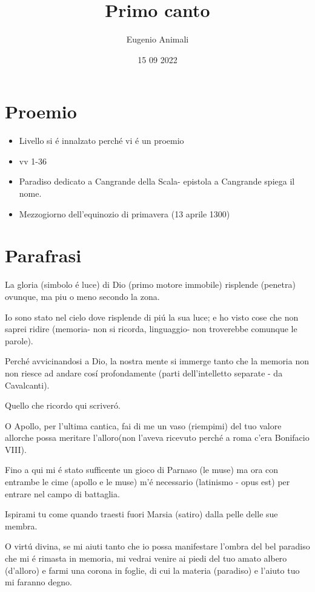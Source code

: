 \documentclass{article}
\title{Primo canto}
\author{Eugenio Animali}
\date{15 09 2022}
\begin{document}
\maketitle

\section*{Proemio}

\begin{itemize}
\item Livello si é innalzato perché vi é un proemio
\item vv 1-36
\item Paradiso dedicato a Cangrande della Scala- epistola a Cangrande spiega il nome.
\item Mezzogiorno dell'equinozio di primavera (13 aprile 1300)
\end{itemize}

\section*{Parafrasi}
La gloria (simbolo é luce) di Dio (primo motore immobile) risplende (penetra) ovunque, ma piu o meno secondo la zona.

Io sono stato nel cielo dove risplende di piú la sua luce; e ho visto cose che non saprei ridire (memoria- non si ricorda, linguaggio- non troverebbe comunque le parole).

Perché avvicinandosi a Dio, la nostra mente si immerge tanto che la memoria non non riesce ad andare cosí profondamente (parti dell'intelletto separate - da Cavalcanti).

Quello che ricordo qui scriveró.

O Apollo, per l'ultima cantica, fai di me un vaso (riempimi) del tuo valore allorche possa meritare l'alloro(non l'aveva ricevuto perché a roma c'era Bonifacio VIII).

Fino a qui mi é stato sufficente un gioco di Parnaso (le muse) ma ora con entrambe le cime (apollo e le muse) m'é necessario (latinismo - opus est) per entrare nel campo di battaglia.

Ispirami tu come quando traesti fuori Marsia (satiro) dalla pelle delle sue membra.

O virtú divina, se mi aiuti tanto che io possa manifestare l'ombra del bel paradiso che mi é rimasta in memoria, mi vedrai venire ai piedi del tuo amato albero (d'alloro) e farmi una corona in foglie, di cui la materia (paradiso) e l'aiuto tuo mi faranno degno.
\end{document}

